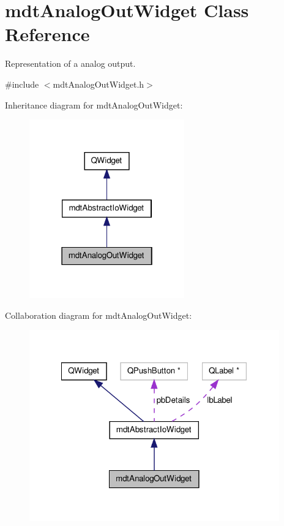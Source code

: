 \hypertarget{classmdt_analog_out_widget}{\section{mdt\-Analog\-Out\-Widget Class Reference}
\label{classmdt_analog_out_widget}
}


Representation of a analog output.  




{\ttfamily \#include $<$mdt\-Analog\-Out\-Widget.\-h$>$}



Inheritance diagram for mdt\-Analog\-Out\-Widget\-:\nopagebreak
\begin{figure}[H]
\begin{center}
\leavevmode
\includegraphics[width=190pt]{classmdt_analog_out_widget__inherit__graph}
\end{center}
\end{figure}


Collaboration diagram for mdt\-Analog\-Out\-Widget\-:\nopagebreak
\begin{figure}[H]
\begin{center}
\leavevmode
\includegraphics[width=306pt]{classmdt_analog_out_widget__coll__graph}
\end{center}
\end{figure}
